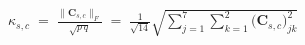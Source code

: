 \documentclass[border=10pt]{standalone}
\newcommand{\eqcol}{\color{sbnavy}}
\begin{document}
{\fontsize{26}{32}\selectfont \eqcol $\displaystyle \kappa_{s,c} \;=\; \frac{\lVert \mathbf{C}_{s,c}\rVert_F}{\sqrt{p\,q}} \;=\; \frac{1}{\sqrt{14}}\sqrt{\sum_{j=1}^{7}\sum_{k=1}^{2}\big(\mathbf{C}_{s,c}\big)_{jk}^{2}}$}
\end{document}

